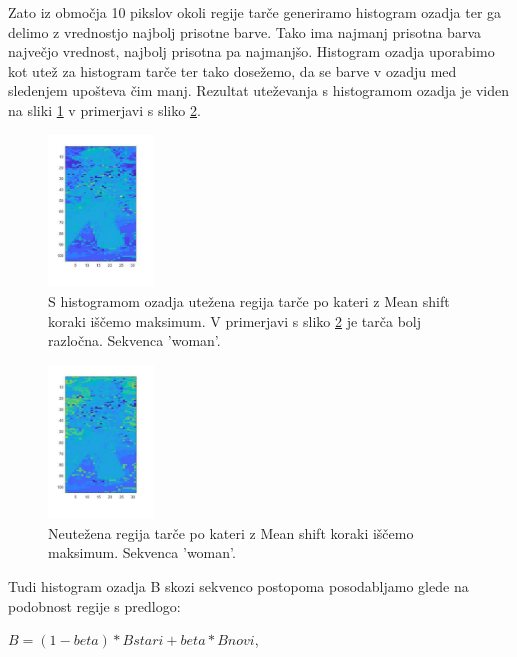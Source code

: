 \documentclass[a4paper]{article}
\begin{document}
Zato iz območja 10 pikslov okoli regije tarče generiramo histogram ozadja ter ga delimo z vrednostjo najbolj prisotne barve. Tako ima najmanj prisotna barva največjo vrednost, najbolj prisotna pa najmanjšo. Histogram ozadja uporabimo kot utež za histogram tarče ter tako dosežemo, da se barve v ozadju med sledenjem upošteva čim manj. Rezultat uteževanja s histogramom ozadja je viden na sliki \ref{ozadje} v primerjavi s sliko \ref{brezozadja}. 

\begin{figure}[h]
	\begin{center}
		\includegraphics [width=0.25\textwidth] {ozadje.pdf}
	\end{center}
	\caption{S histogramom ozadja utežena regija tarče po kateri z Mean shift koraki iščemo maksimum. V primerjavi s sliko \ref{brezozadja} je tarča bolj razločna. Sekvenca 'woman'.}
	\label{ozadje}
\end{figure}

\begin{figure}[h]
	\begin{center}
		\includegraphics [width=0.25\textwidth] {brezozadja.pdf}
	\end{center}
	\caption{Neutežena regija tarče po kateri z Mean shift koraki iščemo maksimum. Sekvenca 'woman'.}
	\label{brezozadja}
\end{figure}

Tudi histogram ozadja B skozi sekvenco postopoma posodabljamo glede na podobnost regije s predlogo: 

$B = (1-beta)*Bstari + beta*Bnovi$, 
\end{document}
